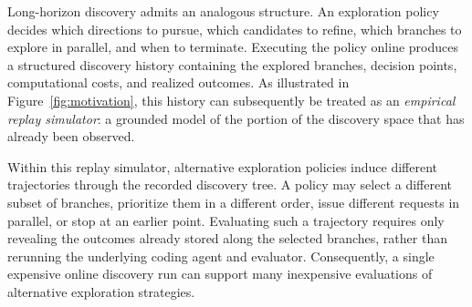 Long-horizon discovery admits an analogous structure. An exploration policy decides which directions to pursue, which candidates to refine, which branches to explore in parallel, and when to terminate. Executing the policy online produces a structured discovery history containing the explored branches, decision points, computational costs, and realized outcomes. As illustrated in
Figure~\ref{fig:motivation}, this history can subsequently be treated as an \emph{empirical replay simulator}: a grounded model of the portion of the discovery space that has already been observed.

Within this replay simulator, alternative exploration policies induce different trajectories through the recorded discovery tree. A policy may select a different subset of branches, prioritize them in a different order, issue different requests in parallel, or stop at an earlier point. Evaluating such a trajectory requires only revealing the outcomes already stored along the
selected branches, rather than rerunning the underlying coding agent and evaluator. Consequently, a single expensive online discovery run can support many inexpensive evaluations of alternative exploration strategies.

